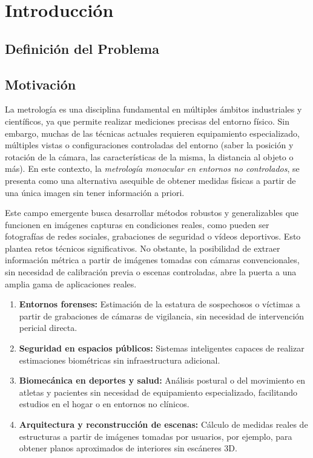 \chapter{Introducción}
\section{Definición del Problema}   
\section{Motivación}
La metrología es una disciplina fundamental en múltiples ámbitos industriales y científicos, ya que permite realizar mediciones precisas del entorno físico. 
Sin embargo, muchas de las técnicas actuales requieren equipamiento especializado, múltiples vistas o configuraciones controladas del entorno (saber la posición y rotación de la cámara, las características de la misma, la distancia al objeto o más).
En este contexto, la \emph{metrología monocular en entornos no controlados}, se presenta como una alternativa asequible de obtener medidas físicas a partir de una única imagen
sin tener información a priori.
\par
Este campo emergente busca desarrollar métodos robustos y generalizables que funcionen en imágenes capturas en condiciones reales, como pueden ser 
fotografías de redes sociales, grabaciones de seguridad o vídeos deportivos. Esto plantea retos técnicos significativos.
No obstante, la posibilidad de extraer información métrica a partir de imágenes tomadas con cámaras convencionales, sin necesidad de calibración previa o escenas controladas, 
abre la puerta a una amplia gama de aplicaciones reales. 
\begin{enumerate}
    \item \textbf{Entornos forenses:} Estimación de la estatura de sospechosos o víctimas a partir de grabaciones de cámaras de vigilancia, sin necesidad de intervención pericial directa.
    \item \textbf{Seguridad en espacios públicos:} Sistemas inteligentes capaces de realizar estimaciones biométricas sin infraestructura adicional.
    \item \textbf{Biomecánica en deportes y salud:} Análisis postural o del movimiento en atletas y pacientes sin necesidad de equipamiento especializado, facilitando estudios en el hogar o en entornos no clínicos.
    \item \textbf{Arquitectura y reconstrucción de escenas:} Cálculo de medidas reales de estructuras a partir de imágenes tomadas por usuarios, por ejemplo, para obtener planos aproximados de interiores sin escáneres 3D.
\end{enumerate}


